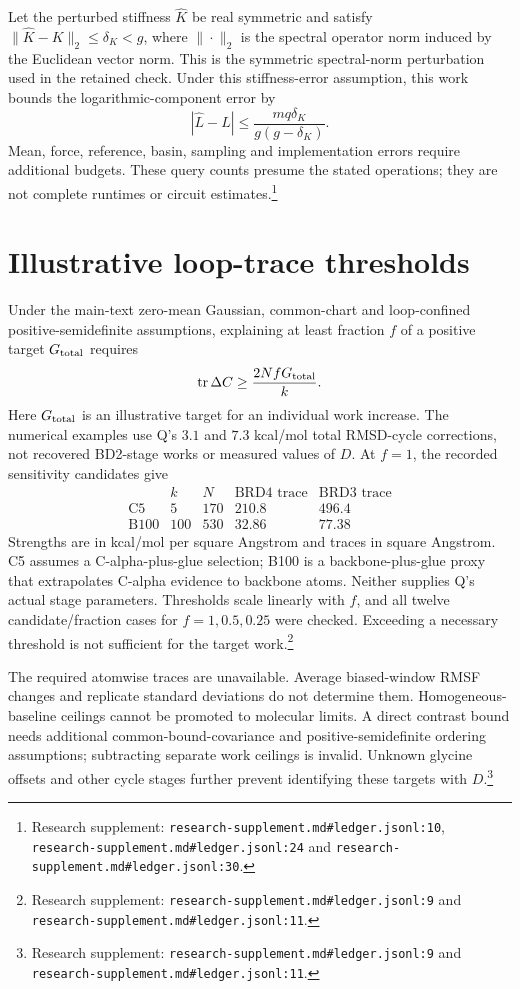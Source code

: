 \documentclass{article}
\begin{document}
Let the perturbed stiffness \(\widehat K\) be real symmetric and satisfy \(\|\widehat K-K\|_2\leq\delta_K<g\), where \(\|\cdot\|_2\) is the spectral operator norm induced by the Euclidean vector norm. This is the symmetric spectral-norm perturbation used in the retained check. Under this stiffness-error assumption, this work bounds the logarithmic-component error by
\[
 |\widehat L-L|\leq\frac{mq\delta_K}{g(g-\delta_K)}.
\]
Mean, force, reference, basin, sampling and implementation errors require additional budgets. These query counts presume the stated operations; they are not complete runtimes or circuit estimates.\footnote{Research supplement: \nolinkurl{research-supplement.md\#ledger.jsonl:10}, \nolinkurl{research-supplement.md\#ledger.jsonl:24} and \nolinkurl{research-supplement.md\#ledger.jsonl:30}.}

\section{Illustrative loop-trace thresholds}\label{app:loop}

Under the main-text zero-mean Gaussian, common-chart and loop-confined positive-semidefinite assumptions, explaining at least fraction \(f\) of a positive target \(G_{\rm total}\) requires
\[
 \operatorname{tr}\Delta C\geq\frac{2NfG_{\rm total}}k.
\]
Here \(G_{\rm total}\) is an illustrative target for an individual work increase. The numerical examples use Q's \(3.1\) and \(7.3\) kcal/mol total RMSD-cycle corrections, not recovered BD2-stage works or measured values of \(D\). At \(f=1\), the recorded sensitivity candidates give
\[
\begin{array}{lcccc}
 &k&N&\text{BRD4 trace}&\text{BRD3 trace}\\
\text{C5}&5&170&210.8&496.4\\
\text{B100}&100&530&32.86&77.38
\end{array}
\]
Strengths are in kcal/mol per square Angstrom and traces in square Angstrom. C5 assumes a C-alpha-plus-glue selection; B100 is a backbone-plus-glue proxy that extrapolates C-alpha evidence to backbone atoms. Neither supplies Q's actual stage parameters. Thresholds scale linearly with \(f\), and all twelve candidate/fraction cases for \(f=1,0.5,0.25\) were checked. Exceeding a necessary threshold is not sufficient for the target work.\footnote{Research supplement: \nolinkurl{research-supplement.md\#ledger.jsonl:9} and \nolinkurl{research-supplement.md\#ledger.jsonl:11}.}

The required atomwise traces are unavailable. Average biased-window RMSF changes and replicate standard deviations do not determine them. Homogeneous-baseline ceilings cannot be promoted to molecular limits. A direct contrast bound needs additional common-bound-covariance and positive-semidefinite ordering assumptions; subtracting separate work ceilings is invalid. Unknown glycine offsets and other cycle stages further prevent identifying these targets with \(D\).\footnote{Research supplement: \nolinkurl{research-supplement.md\#ledger.jsonl:9} and \nolinkurl{research-supplement.md\#ledger.jsonl:11}.}
\end{document}

